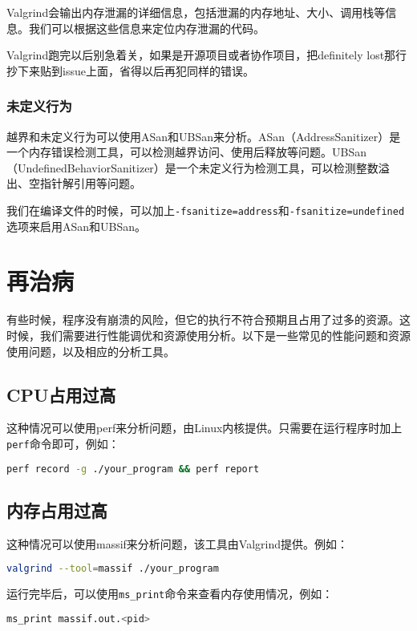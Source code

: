 \documentclass[../main.tex]{subfiles}
\begin{document}
Valgrind会输出内存泄漏的详细信息，包括泄漏的内存地址、大小、调用栈等信息。我们可以根据这些信息来定位内存泄漏的代码。

Valgrind跑完以后别急着关，如果是开源项目或者协作项目，把definitely lost那行抄下来贴到issue上面，省得以后再犯同样的错误。

\subsubsection{未定义行为}

越界和未定义行为可以使用ASan和UBSan来分析。ASan（AddressSanitizer）是一个内存错误检测工具，可以检测越界访问、使用后释放等问题。UBSan（UndefinedBehaviorSanitizer）是一个未定义行为检测工具，可以检测整数溢出、空指针解引用等问题。

我们在编译文件的时候，可以加上\texttt{-fsanitize=address}和\texttt{-fsanitize=undefined}选项来启用ASan和UBSan。

\section{再治病}

有些时候，程序没有崩溃的风险，但它的执行不符合预期且占用了过多的资源。这时候，我们需要进行性能调优和资源使用分析。以下是一些常见的性能问题和资源使用问题，以及相应的分析工具。

\subsection{CPU占用过高}

这种情况可以使用perf来分析问题，由Linux内核提供。只需要在运行程序时加上\texttt{perf}命令即可，例如：
\begin{lstlisting}[language=bash]
    perf record -g ./your_program && perf report
\end{lstlisting}

\subsection{内存占用过高}

这种情况可以使用massif来分析问题，该工具由Valgrind提供。例如：
\begin{lstlisting}[language=bash]
    valgrind --tool=massif ./your_program
\end{lstlisting}

运行完毕后，可以使用\texttt{ms\_print}命令来查看内存使用情况，例如：
\begin{lstlisting}[language=bash]
    ms_print massif.out.<pid>
\end{lstlisting}
\end{document}
